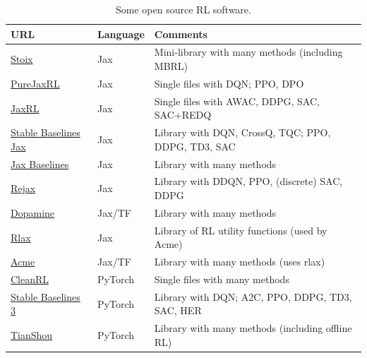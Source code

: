 \begin{table}
  \centering
  \footnotesize
  \begin{tabular}{lll}
    URL & Language & Comments \\ \hline
    \href{https://github.com/EdanToledo/Stoix}{Stoix}
    & Jax & Mini-library with many methods (including MBRL)
    \\
    \href{https://github.com/luchris429/purejaxrl/tree/main}{PureJaxRL}
    & Jax & Single files with DQN; PPO, DPO
    \\
    \href{https://github.com/ikostrikov/jaxrl}{JaxRL}
    & Jax & Single files  with AWAC, DDPG, SAC, SAC+REDQ
        \\
    \href{https://stable-baselines3.readthedocs.io/en/master/guide/sbx.html}
         {Stable Baselines Jax}
         & Jax & Library with  DQN, CrossQ, TQC;  PPO, DDPG, TD3, SAC
     \\
     \href{https://github.com/tinker495/jax-baseline}{Jax Baselines}
     &  Jax & Library with many methods
     \\
     \href{https://github.com/keraJLi/rejax}{Rejax}
     & Jax & Library with DDQN, PPO, (discrete) SAC, DDPG
     \\
         \href{https://github.com/google/dopamine}{Dopamine}
         & Jax/TF & Library with many methods
\\
     \href{https://github.com/google-deepmind/rlax/tree/master}{Rlax}
     & Jax & Library of RL utility functions (used by Acme)
     \\
     \href{https://github.com/google-deepmind/acme/tree/master}{Acme}
     & Jax/TF & Library with many methods (uses rlax)
     \\
         \href{https://github.com/vwxyzjn/cleanrl}{CleanRL}
    & PyTorch & Single files with many methods
    \\
    \href{https://stable-baselines3.readthedocs.io/en/master/}{Stable
      Baselines 3}
    & PyTorch & Library with DQN; A2C, PPO, DDPG, TD3, SAC, HER
    \\
    \href{https://github.com/thu-ml/tianshou/}{TianShou}
    & PyTorch & Library with many methods (including offline RL)
    \end{tabular}
  \label{tab:software}
  \caption{Some open source RL software.}
\end{table}

